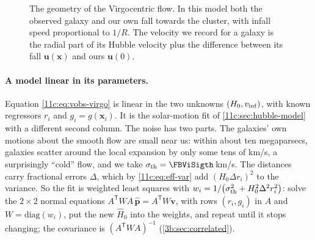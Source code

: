 \begin{figure}[htbp]
\centering
{}
\caption{The geometry of the Virgocentric flow. In this model both the observed galaxy and our own fall towards the cluster, with infall speed proportional to $1/R$. The velocity we
record for a galaxy is the radial part of its Hubble velocity plus the difference
between its fall $\bm u(\bm x)$ and ours $\bm u(0)$.}
\label{11c:fig:virgo-geometry}
\end{figure}

\paragraph{A model linear in its parameters.} Equation \eqref{11c:eq:vobs-virgo} is
linear in the two unknowns $(H_0,v_{\rm inf})$, with known regressors $r_i$ and
$g_i=g(\bm x_i)$. It is the solar-motion fit of \cref{11c:sec:hubble-model} with a
different second column. The noise has two parts. The galaxies' own motions about
the smooth flow are small near us: within about ten megaparsecs, galaxies scatter
around the local expansion by only some tens of km/s, a surprisingly ``cold''
flow, and we take $\sigma_{\rm th}=\FBViSigth$\,km/s. The distances carry
fractional errors $\Delta$, which by \eqref{11c:eq:eff-var} add
$(H_0\Delta r_i)^2$ to the variance. So the fit is weighted least squares with
$w_i=1/\bigl(\sigma_{\rm th}^2+H_0^2\Delta^2r_i^2\bigr)$: solve the $2\times2$ normal
equations $A^{\mathsf T}WA\,\hat{\bm p}=A^{\mathsf T}W\bm v$, with rows $(r_i,g_i)$ in $A$
and $W=\mathrm{diag}(w_i)$, put the new $\hat H_0$ into the weights, and repeat until
it stops changing; the covariance is $(A^{\mathsf T}WA)^{-1}$
(\cref{3b:sec:correlated}).

